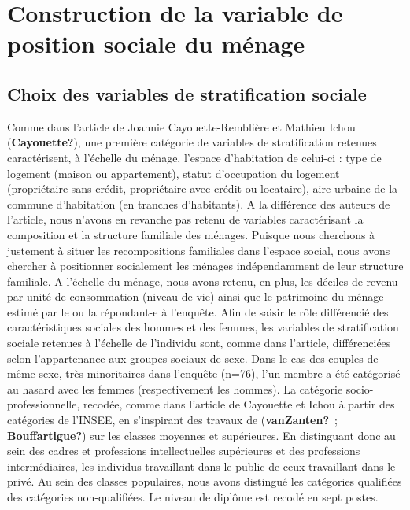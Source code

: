 \documentclass[
  12pt,
]{book}
\begin{document}
\section{Construction de la variable de position sociale du
ménage}\label{construction-de-la-variable-de-position-sociale-du-muxe9nage}

\subsection{Choix des variables de stratification
sociale}\label{choix-des-variables-de-stratification-sociale}

Comme dans l'article de Joannie Cayouette-Remblière et Mathieu Ichou
(\textbf{Cayouette?}), une première catégorie de variables de
stratification retenues caractérisent, à l'échelle du ménage, l'espace
d'habitation de celui-ci : type de logement (maison ou appartement),
statut d'occupation du logement (propriétaire sans crédit, propriétaire
avec crédit ou locataire), aire urbaine de la commune d'habitation (en
tranches d'habitants). A la différence des auteurs de l'article, nous
n'avons en revanche pas retenu de variables caractérisant la composition
et la structure familiale des ménages. Puisque nous cherchons à
justement à situer les recompositions familiales dans l'espace social,
nous avons chercher à positionner socialement les ménages indépendamment
de leur structure familiale. A l'échelle du ménage, nous avons retenu,
en plus, les déciles de revenu par unité de consommation (niveau de vie)
ainsi que le patrimoine du ménage estimé par le ou la répondant-e à
l'enquête. Afin de saisir le rôle différencié des caractéristiques
sociales des hommes et des femmes, les variables de stratification
sociale retenues à l'échelle de l'individu sont, comme dans l'article,
différenciées selon l'appartenance aux groupes sociaux de sexe. Dans le
cas des couples de même sexe, très minoritaires dans l'enquête (n=76),
l'un membre a été catégorisé au hasard avec les femmes (respectivement
les hommes). La catégorie socio-professionnelle, recodée, comme dans
l'article de Cayouette et Ichou à partir des catégories de l'INSEE, en
s'inspirant des travaux de (\textbf{vanZanten?}~;
\textbf{Bouffartigue?}) sur les classes moyennes et supérieures. En
distinguant donc au sein des cadres et professions intellectuelles
supérieures et des professions intermédiaires, les individus travaillant
dans le public de ceux travaillant dans le privé. Au sein des classes
populaires, nous avons distingué les catégories qualifiées des
catégories non-qualifiées. Le niveau de diplôme est recodé en sept
postes.
\end{document}
